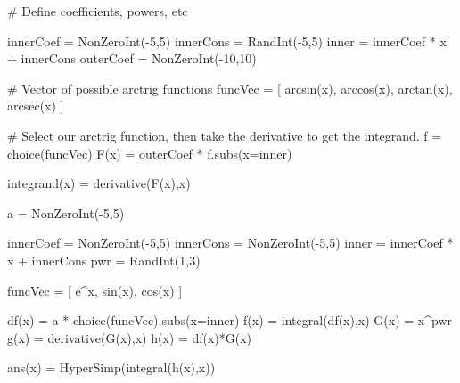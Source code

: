\begin{sagesilent}
# Define coefficients, powers, etc

innerCoef = NonZeroInt(-5,5)
innerCons = RandInt(-5,5)
inner = innerCoef * x + innerCons
outerCoef = NonZeroInt(-10,10)


# Vector of possible arctrig functions
funcVec = [
  arcsin(x), 
  arccos(x), 
  arctan(x), 
  arcsec(x)
]

# Select our arctrig function, then take the derivative to get the integrand.
f = choice(funcVec)
F(x) = outerCoef * f.subs(x=inner)

integrand(x) = derivative(F(x),x)

\end{sagesilent}




\begin{sagesilent}
a = NonZeroInt(-5,5)

innerCoef = NonZeroInt(-5,5)
innerCons = NonZeroInt(-5,5)
inner = innerCoef * x + innerCons
pwr = RandInt(1,3)

funcVec = [
  e^x,
  sin(x),
  cos(x)
]

df(x) = a * choice(funcVec).subs(x=inner)
f(x) = integral(df(x),x)
G(x) = x^pwr 
g(x) = derivative(G(x),x)
h(x) = df(x)*G(x)

ans(x) = HyperSimp(integral(h(x),x))

\end{sagesilent}


